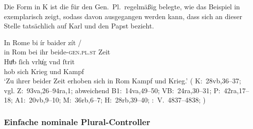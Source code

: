 Die Form  in K ist die für den Gen.\ Pl.\ regelmäßig belegte, wie
das Beispiel in  exemplarisch zeigt, sodass davon ausgegangen
werden kann, dass sich  an dieser Stelle tatsächlich auf Karl und
den Papst bezieht.

\begin{exe}
\ex \label{ex:k_beider}

		\gll In Rome bi ír baider zít {/} \\
			in Rom bei ihr beide-\textsc{gen.pl.st} Zeit \\
		\gll Huͦb ſich vrlu̍g vnd ſtrit \\
			hob sich Krieg und Kampf \\
		\trans `Zu ihrer beider Zeit erhoben sich in Rom Kampf und Krieg.'
			(%
				K:~28vb,36--37; vgl.
				Z:~93va,26--94ra,1; abweichend
				B1:~14va,49--50;
				VB:~24ra,30--31;
				P:~42ra,17--18;
				A1:~20vb,9--10;
				M:~36rb,6--7;
				H:~28rb,39--40;
				\KC:~V.~4837--4838;
				\cite[170]{schroeder1895}%
			)

\end{exe}

\subsubsection{Einfache nominale Plural-Controller}
\label{subsubsec:nomctrlpers}

